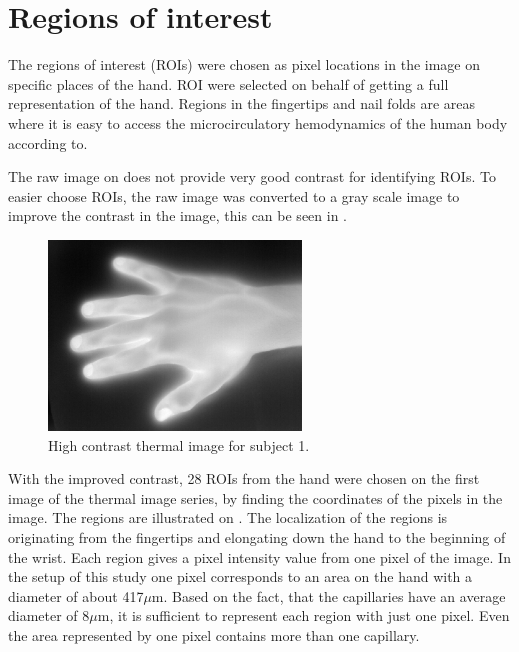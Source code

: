 \section{Regions of interest}

The regions of interest (ROIs) were chosen as pixel locations in the image on specific places of the hand. ROI were selected on behalf of getting a full representation of the hand. 
Regions in the fingertips and nail folds are areas where it is easy to access the microcirculatory hemodynamics of the human body according to\cite{Iabichella2006}. 

The raw image on  does not provide very good contrast for identifying ROIs. To easier choose ROIs, the raw image was converted to a gray scale image to improve the contrast in the image, this can be seen in . 

\begin{figure}[H]
	\includegraphics[width=0.6\textwidth]{figures/mat2grayHand}  %
	\caption{High contrast thermal image for subject 1.}
	\label{fig:mat2grayHand}  %
\end{figure}

With the improved contrast, 28 ROIs from the hand were chosen on the first image of the thermal image series, by finding the coordinates of the pixels in the image. The regions are illustrated on . The localization of the regions is originating from the fingertips and elongating down the hand to the beginning of the wrist. Each region gives a pixel intensity value from one pixel of the image. In the setup of this study one pixel corresponds to an area on the hand with a diameter of about 417$\mu$m. Based on the fact, that the capillaries have an average diameter of 8$\mu$m\cite{martini2012}, it is sufficient to represent each region with just one pixel. Even the area represented by one pixel contains more than one capillary.

